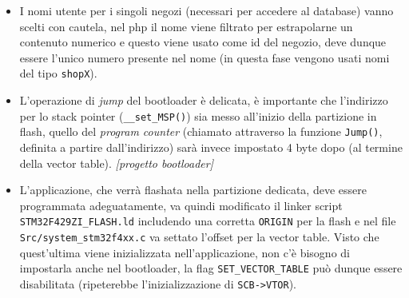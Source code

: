 \begin{itemize}
  \item I nomi utente per i singoli negozi (necessari per accedere al database) vanno scelti con cautela, nel php il nome viene filtrato per estrapolarne un contenuto numerico e questo viene usato come id del negozio, deve dunque essere l'unico numero presente nel nome (in questa fase vengono usati nomi del tipo \texttt{shopX}).
  \item L'operazione di \textit{jump} del bootloader \`e delicata, \`e importante che l'indirizzo per lo stack pointer (\texttt{\_\_set\_MSP()}) sia messo all'inizio della partizione in flash, quello del \textit{program counter} (chiamato attraverso la funzione \texttt{Jump()}, definita a partire dall'indirizzo) sar\`a invece impostato 4 byte dopo (al termine della vector table). \textit{[progetto bootloader]}
  \item L'applicazione, che verr\`a flashata nella partizione dedicata, deve essere programmata adeguatamente, va quindi modificato il linker script \texttt{STM32F429ZI\_FLASH.ld} includendo una corretta \texttt{ORIGIN} per la flash e nel file \texttt{Src/system\_stm32f4xx.c} va settato l'offset per la vector table. Visto che quest'ultima viene inizializzata nell'applicazione, non c'\`e bisogno di impostarla anche nel bootloader, la flag \texttt{SET\_VECTOR\_TABLE} pu\`o dunque essere disabilitata (ripeterebbe l'inizializzazione di \texttt{SCB->VTOR}).
\end{itemize}
